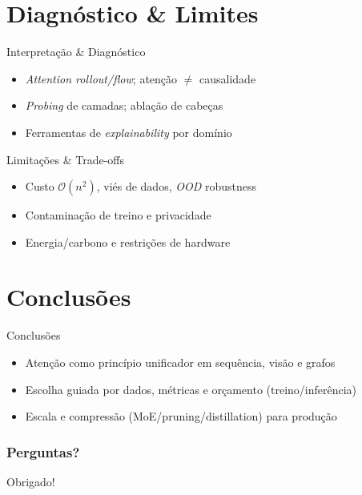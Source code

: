 \documentclass{beamer}
\begin{document}


\section{Diagnóstico \& Limites}
\begin{frame}{Interpretação \& Diagnóstico}
	\begin{itemize}
		\item \textit{Attention rollout/flow}; atenção $\neq$ causalidade
		\item \textit{Probing} de camadas; ablação de cabeças
		\item Ferramentas de \textit{explainability} por domínio
	\end{itemize}
\end{frame}

\begin{frame}{Limitações \& Trade-offs}
	\begin{itemize}
		\item Custo $\mathcal{O}(n^2)$, viés de dados, \textit{OOD} robustness
		\item Contaminação de treino e privacidade
		\item Energia/carbono e restrições de hardware
	\end{itemize}
\end{frame}

\section{Conclusões}
\begin{frame}{Conclusões}
	\begin{itemize}
		\item Atenção como princípio unificador em sequência, visão e grafos
		\item Escolha guiada por dados, métricas e orçamento (treino/inferência)
		\item Escala e compressão (MoE/pruning/distillation) para produção
	\end{itemize}
\end{frame}

\backmatter
\begin{frame}
	\frametitle{Perguntas?}
	\centering
	Obrigado!
\end{frame}
\end{document}
